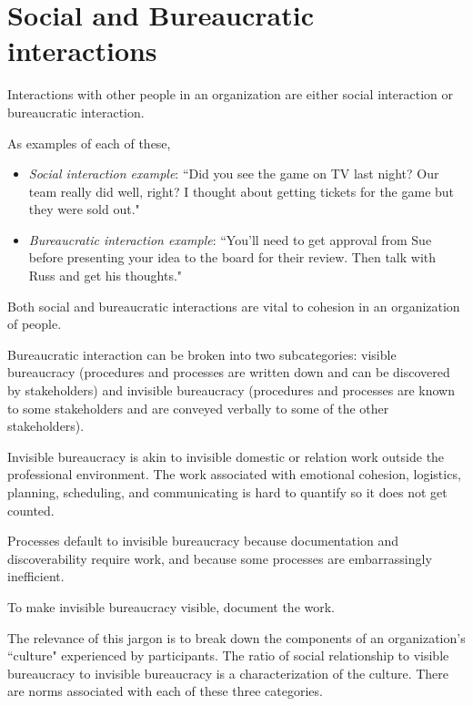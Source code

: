 
\section{Social and Bureaucratic interactions\label{sec:socializing}}

Interactions with other people in an organization are either social interaction or bureaucratic interaction. 

As examples of each of these,
\begin{itemize}
\item \textit{Social interaction example}: ``Did you see the game on TV last night? Our team really did well, right? I thought about getting tickets for the game but they were sold out."
\item \textit{Bureaucratic interaction example}: ``You'll need to get approval from Sue before presenting your idea to the board for their review. Then talk with Russ and get his thoughts."
\end{itemize}
Both social and bureaucratic interactions are vital to cohesion in an organization of people. 


Bureaucratic interaction can be broken into two subcategories: 
\gls{visible bureaucracy} 
(procedures and processes are written down and can be discovered by stakeholders) and 
\gls{invisible bureaucracy} 
(procedures and processes are known to some stakeholders and are conveyed verbally to some of the other stakeholders).

Invisible bureaucracy is akin to invisible domestic or relation work outside the professional environment. The work associated with emotional cohesion, logistics, planning, scheduling, and communicating is hard to quantify so it does not get counted.

Processes default to invisible bureaucracy because documentation and discoverability require work, and because some processes are embarrassingly inefficient. 

To make invisible bureaucracy visible, document the work.


The relevance of this jargon is to break down the components of an organization's ``culture" experienced by participants. The ratio of social relationship to visible bureaucracy to invisible bureaucracy is a characterization of the culture. There are norms associated with each of these three categories.
